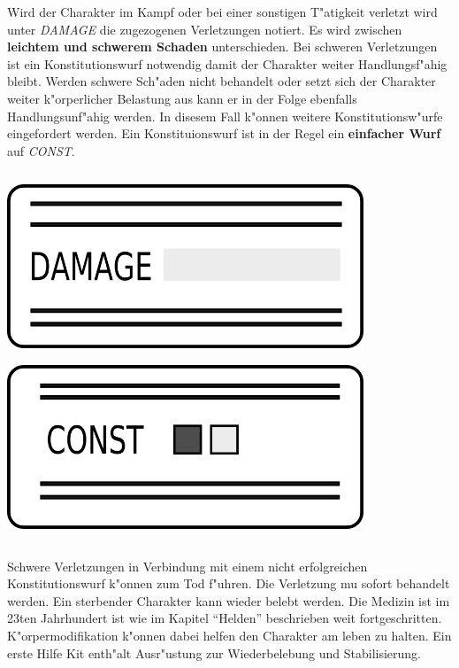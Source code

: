 \begin{column}[l]{0.58}
    Wird der Charakter im Kampf oder bei einer sonstigen T"atigkeit verletzt wird unter \emph{DAMAGE} die zugezogenen Verletzungen notiert. 
    Es wird zwischen \textbf{leichtem und schwerem Schaden} unterschieden. Bei schweren Verletzungen ist ein Konstitutionswurf notwendig damit der Charakter weiter Handlungsf"ahig bleibt. Werden schwere Sch"aden nicht behandelt oder setzt sich der Charakter weiter k"orperlicher Belastung aus kann er in der Folge ebenfalls Handlungsunf"ahig werden. In disesem Fall k"onnen weitere Konstitutionsw"urfe eingefordert werden. Ein Konstituionswurf ist in der Regel ein \textbf{einfacher Wurf} auf \emph{CONST}.
\end{column}
\begin{column}[r]{0.42}
    \centering
    \includegraphics[width=0.80\textwidth]{images/character_damage.png}

    \includegraphics[width=0.80\textwidth]{images/character_const.png}
\end{column}
\smallskip

Schwere Verletzungen in Verbindung mit einem nicht erfolgreichen Konstitutionswurf k"onnen zum Tod f"uhren. Die Verletzung mu\3 sofort behandelt werden. Ein sterbender Charakter kann wieder belebt werden. Die Medizin ist im 23ten Jahrhundert ist wie im Kapitel "`Helden"' beschrieben weit fortgeschritten. K"orpermodifikation k"onnen dabei helfen den Charakter am leben zu halten. Ein erste Hilfe Kit enth"alt Ausr"ustung zur Wiederbelebung und Stabilisierung.



